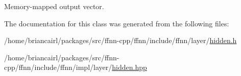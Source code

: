 Memory-\/mapped output vector. 



The documentation for this class was generated from the following files\-:\begin{DoxyCompactItemize}
\item 
/home/briancairl/packages/src/ffnn-\/cpp/ffnn/include/ffnn/layer/\hyperlink{hidden_8h}{hidden.\-h}\item 
/home/briancairl/packages/src/ffnn-\/cpp/ffnn/include/ffnn/impl/layer/\hyperlink{hidden_8hpp}{hidden.\-hpp}\end{DoxyCompactItemize}

